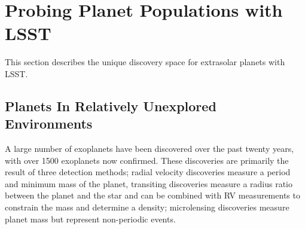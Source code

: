 
%
%
%
%
%
%

\section{Probing Planet Populations with LSST}
\def\secname{periodicvariables}\label{sec:\secname}



This section describes the unique discovery space for extrasolar planets with LSST.

\subsection{Planets In Relatively Unexplored Environments}
A large number of exoplanets have been discovered over the past twenty years, with over 1500 exoplanets now confirmed. These discoveries are primarily the result of three detection methods; radial velocity discoveries measure a period and minimum mass of the planet, transiting discoveries measure a radius ratio between the planet and the star and can be combined with RV measurements to constrain the mass and determine a density; microlensing discoveries measure planet mass but represent non-periodic events.

